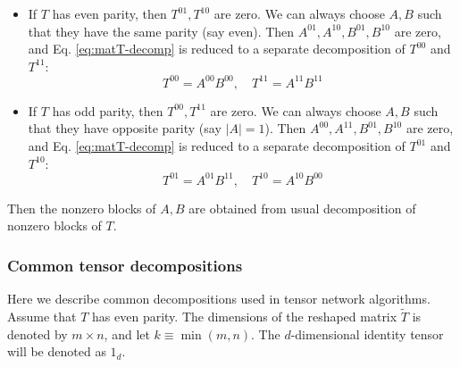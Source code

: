 \documentclass[11pt]{article}
\begin{document}
\begin{itemize}
\item If $T$ has even parity, then $T^{01}, T^{10}$ are zero. We can always choose $A, B$ such that they have the same parity (say even). Then $A^{01}, A^{10}, B^{01}, B^{10}$ are zero, and Eq. \eqref{eq:matT-decomp} is reduced to a separate decomposition of $T^{00}$ and $T^{11}$:
\begin{equation}
    T^{00} = A^{00} B^{00} 
    , \quad
    T^{11} = A^{11} B^{11}
\end{equation}
\item If $T$ has odd parity, then $T^{00}, T^{11}$ are zero. We can always choose $A, B$ such that they have opposite parity (say $|A| = 1$). Then $A^{00}, A^{11}, B^{01}, B^{10}$ are zero, and Eq. \eqref{eq:matT-decomp} is reduced to a separate decomposition of $T^{01}$ and $T^{10}$:
\begin{equation}
    T^{01} = A^{01} B^{11}
    , \quad
    T^{10} = A^{10} B^{00} 
\end{equation}
\end{itemize}
Then the nonzero blocks of $A, B$ are obtained from usual decomposition of nonzero blocks of $T$.

\subsubsection{Common tensor decompositions}
\begingroup
\def\leftlegs{
    \lineHa{-0.3}{-1}{0.7}
    \node at (-0.7,0.1) {$\vdots$};
    \lineHa{-1}{-0.3}{-0.7}
}
\def\rightlegs{
    \lineHa{0.3}{1}{0.7}
    \node at (0.7,0.1) {$\vdots$};
    \lineHa{1}{0.3}{-0.7}
}

Here we describe common decompositions used in tensor network algorithms. Assume that $T$ has even parity. The dimensions of the reshaped matrix $\tilde{T}$ is denoted by $m \times n$, and let $k \equiv \min(m,n)$. 
The $d$-dimensional identity tensor will be denoted as $1_d$. 
\end{document}
